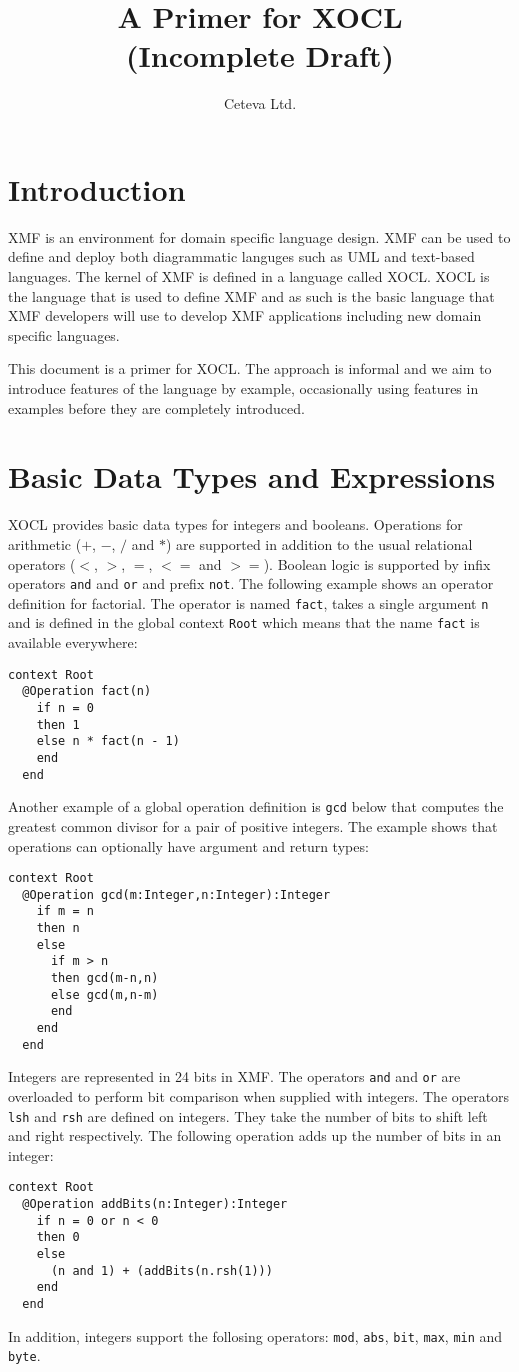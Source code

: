 \documentclass{article}
\title{A Primer for XOCL\\(Incomplete Draft)}
\author{Ceteva Ltd.}
\begin{document}
\maketitle

\section{Introduction}

XMF is an environment for domain specific language design. XMF can be used
to define and deploy both diagrammatic languges such as UML and text-based
languages. The kernel of XMF is defined in a language called XOCL. XOCL
is the language that is used to define XMF and as such is the basic language
that XMF developers will use to develop XMF applications including new
domain specific languages. 

This document is a primer for XOCL. The approach is informal and we aim to 
introduce features of the language by example, occasionally using features 
in examples before they are completely introduced.

\section{Basic Data Types and Expressions}

XOCL provides basic data types for integers and booleans. Operations for
arithmetic ($+$, $-$, $/$ and $*$) are supported in addition to the usual
relational operators ($<$, $>$, $=$, $<=$ and $>=$). Boolean logic is supported
by infix operators {\tt and} and {\tt or} and prefix {\tt not}. The following example
shows an operator definition for factorial. The operator is named {\tt fact},
takes a single argument {\tt n} and is defined in the global context {\tt Root}
which means that the name {\tt fact} is available everywhere:
\begin{verbatim}
context Root
  @Operation fact(n)
    if n = 0
    then 1
    else n * fact(n - 1)
    end
  end
\end{verbatim}
Another example of a global operation definition is {\tt gcd} below that computes
the greatest common divisor for a pair of positive integers. The example shows that
operations can optionally have argument and return types:
\begin{verbatim}
context Root
  @Operation gcd(m:Integer,n:Integer):Integer
    if m = n 
    then n
    else
      if m > n 
      then gcd(m-n,n)
      else gcd(m,n-m)
      end
    end
  end
\end{verbatim}
Integers are represented in 24 bits in XMF. The operators {\tt and} and {\tt or} are
overloaded to perform bit comparison when supplied with integers. The operators {\tt lsh}
and {\tt rsh} are defined on integers. They take the number of bits to shift left and
right respectively. The following operation adds up the number of bits in an integer:
\begin{verbatim}
context Root
  @Operation addBits(n:Integer):Integer
    if n = 0 or n < 0
    then 0
    else 
      (n and 1) + (addBits(n.rsh(1)))
    end
  end
\end{verbatim}
In addition, integers support the follosing operators: {\tt mod}, {\tt abs}, {\tt bit},
{\tt max}, {\tt min} and {\tt byte}.
\end{document}
